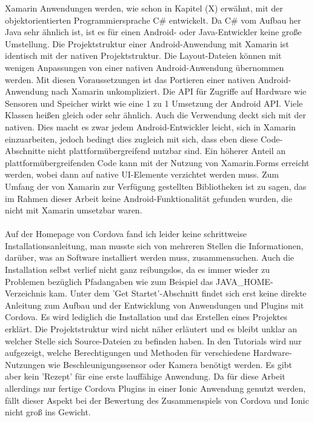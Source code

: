 Xamarin Anwendungen werden, wie schon in Kapitel (X) erwähnt, mit der objektorientierten Programmiersprache C\# entwickelt. Da C\# vom Aufbau her Java sehr ähnlich ist, ist es für einen Android- oder Java-Entwickler keine große Umstellung. Die Projektstruktur einer Android-Anwendung mit Xamarin ist identisch mit der nativen Projektstruktur. Die Layout-Dateien können mit wenigen Anpassungen von einer nativen Android-Anwendung übernommen werden. Mit diesen Voraussetzungen ist das Portieren einer nativen Android-Anwendung nach Xamarin unkompliziert. Die API für Zugriffe auf Hardware wie Sensoren und Speicher wirkt wie eine 1 zu 1 Umsetzung der Android API. Viele Klassen heißen gleich oder sehr ähnlich. Auch die Verwendung deckt sich mit der nativen. Dies macht es zwar jedem Android-Entwickler leicht, sich in Xamarin einzuarbeiten, jedoch bedingt dies zugleich mit sich, dass eben diese Code-Abschnitte nicht plattformübergreifend nutzbar sind. Ein höherer Anteil an plattformübergreifenden Code kann mit der Nutzung von Xamarin.Forms erreicht werden, wobei dann auf native UI-Elemente verzichtet werden muss. Zum Umfang der von Xamarin zur Verfügung gestellten Bibliotheken ist zu sagen, das im Rahmen dieser Arbeit keine Android-Funktionalität gefunden wurden, die nicht mit Xamarin umsetzbar waren. 
\\
\\
Auf der Homepage von Cordova fand ich leider keine schrittweise Installationsanleitung, man musste sich von mehreren Stellen die Informationen, darüber, was an Software installiert werden muss, zusammensuchen. Auch die Installation selbst verlief nicht ganz reibungslos, da es immer wieder zu Problemen bezüglich Pfadangaben wie zum Beispiel das JAVA\_HOME-Verzeichnis kam. Unter dem 'Get Startet'-Abschnitt findet sich erst keine direkte Anleitung zum Aufbau und der Entwicklung von Anwendungen und Plugins mit Cordova. Es wird lediglich die Installation und das Erstellen eines Projektes erklärt. Die Projektstruktur wird nicht näher erläutert und es bleibt unklar an welcher Stelle sich Source-Dateien zu befinden haben. In den Tutorials wird nur aufgezeigt, welche Berechtigungen und Methoden für verschiedene Hardware-Nutzungen wie Beschleunigungssensor oder Kamera benötigt werden. Es gibt aber kein 'Rezept' für eine erste lauffähige Anwendung. Da für diese Arbeit allerdings nur fertige Cordova Plugins in einer Ionic Anwendung genutzt werden, fällt dieser Aspekt bei der Bewertung des Zusammenspiels von Cordova und Ionic nicht groß ins Gewicht. 
\\
